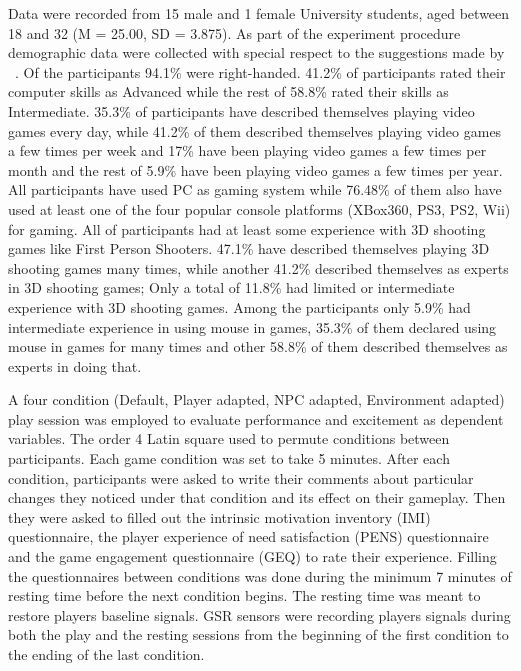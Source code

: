 \documentclass[conference]{IEEEtran}
\begin{document}
Data were recorded from 15 male and 1 female University students, aged between 18 and 32 (M = 25.00, SD = 3.875). As part of the experiment procedure demographic data were collected with special respect to the suggestions made by ~\cite{stanley2011gemini}. Of the participants 94.1\% were right-handed. 41.2\% of participants rated their computer skills as Advanced while the rest of 58.8\% rated their skills as Intermediate. 35.3\% of participants have described themselves playing video games every day, while 41.2\% of them described themselves playing video games a few times per week and 17\% have been playing video games a few times per month and the rest of 5.9\% have been playing video games a few times per year. All participants have used PC as gaming system while 76.48\% of them also have used at least one of the four popular console platforms (XBox360, PS3, PS2, Wii) for gaming. All of participants had at least some experience with 3D shooting games like First Person Shooters. 47.1\% have described themselves playing 3D shooting games many times, while another 41.2\% described themselves as experts in 3D shooting games; Only a total of 11.8\% had limited or intermediate experience with 3D shooting games. Among the participants only 5.9\% had intermediate experience in using mouse in games, 35.3\% of them declared using mouse in games for many times and other 58.8\% of them described themselves as experts in doing that.


A four condition (Default, Player adapted, NPC adapted, Environment adapted) play session was employed to evaluate performance and excitement as dependent variables. The order 4 Latin square used to permute conditions between participants. Each game condition was set to take 5 minutes. After each condition, participants were asked to write their comments about particular changes they noticed under that condition and its effect on their gameplay. Then they were asked to filled out the intrinsic motivation inventory (IMI) questionnaire, the player experience of need satisfaction (PENS) questionnaire and the game engagement questionnaire (GEQ) to rate their experience. Filling the questionnaires between conditions was done during the minimum 7 minutes of resting time before the next condition begins. The resting time was meant to restore players baseline signals. GSR sensors were recording players signals during both the play and the resting sessions from the beginning of the first condition to the ending of the last condition.
\end{document}
